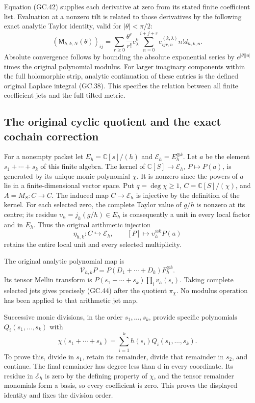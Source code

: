 Equation (GC.42) supplies each derivative at zero from its stated
finite coefficient list. Evaluation at a nonzero tilt is related to
those derivatives by the following exact analytic Taylor identity,
valid for $|\theta|<\pi/2$:
\[
 (\mathsf M_{h,k,N}(\theta))_{ij}
 =\sum_{r\ge0}\frac{\theta^r}{r!}
       c_\lambda^k\sum_{n=0}^{i+j+r}
                    e_{ijr,n}^{(k,\lambda)}n!d_{h,k,n}.        \tag{GC.43}
\]
Absolute convergence follows by bounding the absolute exponential
series by $e^{|\theta||u|}$ times the original polynomial modulus.
For larger imaginary components within the full holomorphic strip,
analytic continuation of these entries is the defined original
Laplace integral (GC.38). This specifies the relation between all
finite coefficient jets and the full tilted metric.

\subsection{The original cyclic quotient and the exact cochain correction}

For a nonempty packet let $E_h=\mathbb C[s]/(h)$ and
$\mathcal E_h=E_h^{\otimes k}$. Let $a$ be the element
$s_1+\cdots+s_k$ of this finite algebra. The kernel of
$\mathbb C[S]\to\mathcal E_h$, $P\mapsto P(a)$, is generated by
its unique monic polynomial $\chi$. It is nonzero since the powers
of $a$ lie in a finite-dimensional vector space. Put
$q=\deg\chi\ge1$, $C=\mathbb C[S]/(\chi)$, and $A=M_S:C\to C$.
The induced map $C\to\mathcal E_h$ is injective by the definition
of the kernel. For each selected zero, the complete Taylor value of
$g/h$ is nonzero at its centre; its residue
$\upsilon_h=j_h(g/h)\in E_h$ is consequently a unit in every
local factor and in $E_h$. Thus the original arithmetic injection
\[
 \eta_{h,k}:C\hookrightarrow\mathcal E_h,\qquad
 [P]\mapsto\upsilon_h^{\otimes k}P(a)                           \tag{GC.44}
\]
retains the entire local unit and every selected multiplicity.

The original analytic polynomial map is
\[
 \mathcal V_{h,k}P=P(D_1+\cdots+D_k)F_h^{\otimes k}.             \tag{GC.45}
\]
Its tensor Mellin transform is
$P(s_1+\cdots+s_k)\prod_i v_h(s_i)$. Taking complete selected
jets gives precisely (GC.44) after the quotient $\pi_\chi$.
No modulus operation has been applied to that arithmetic jet map.

Successive monic divisions, in the order $s_1,\ldots,s_k$, provide
specific polynomials $Q_i(s_1,\ldots,s_k)$ with
\[
 \chi(s_1+\cdots+s_k)=\sum_{i=1}^k h(s_i)Q_i(s_1,\ldots,s_k).
                                                               \tag{GC.46}
\]
To prove this, divide in $s_1$, retain its remainder, divide that
remainder in $s_2$, and continue. The final remainder has degree
less than d in every coordinate. Its residue in $\mathcal E_h$ is
zero by the defining property of $\chi$, and the tensor remainder
monomials form a basis, so every coefficient is zero. This proves
the displayed identity and fixes the division order.

